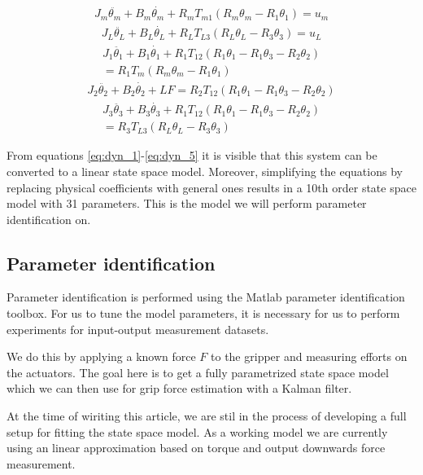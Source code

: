 \documentclass[conference]{IEEEtran}
\begin{document}
\begin{align}\label{eq:dyn_1}
J_m\ddot{{\theta}_m} + B_m \dot{{\theta}_m} + R_m T_{m1}(R_m {\theta}_m - R_1 {\theta}_1) = u_m
\end{align}
\begin{align}\label{eq:dyn_2}
J_L\ddot{{\theta}_L} + B_L \dot{{\theta}_L} + R_L T_{L3}(R_L {\theta}_L - R_3 {\theta}_3) = u_L
\end{align}
\begin{multline}\label{eq:dyn_3}
J_1\ddot{{\theta}_1}+ B_1 \dot{{\theta}_1} + R_1 T_{12}(R_1{\theta_1} - R_1{\theta}_3 - R_2{\theta_2})\\ = R_1 T_m(R_m{\theta}_m - R_1{\theta}_1)
\end{multline}
\begin{align}\label{eq:dyn_4}
J_2\ddot{{\theta}_2}+ B_2 \dot{{\theta}_2} + LF = R_2 T_{12}(R_1{\theta_1} - R_1{\theta}_3 - R_2{\theta_2})
\end{align}
\begin{multline}\label{eq:dyn_5}
J_3\ddot{{\theta}_3}+ B_3 \dot{{\theta}_3} + R_1 T_{12}(R_1{\theta_1} - R_1{\theta}_3 - R_2{\theta_2})\\ = R_3 T_{L3}(R_L{\theta}_L - R_3{\theta}_3)
\end{multline}


From equations \ref{eq:dyn_1}-\ref{eq:dyn_5} it is visible that this system can be converted to a linear state space model.
Moreover, simplifying the equations by replacing physical coefficients with general ones results in a 10th order state space model with 31 parameters.
This is the model we will perform parameter identification on.

\subsection{Parameter identification}
Parameter identification is performed using the Matlab parameter identification toolbox.
For us to tune the model parameters, it is necessary for us to perform experiments for input-output measurement datasets.

We do this by applying a known force $F$ to the gripper and measuring efforts on the actuators.
The goal here is to get a fully parametrized state space model which we can then use for grip force estimation with a Kalman filter.

At the time of wiriting this article, we are stil in the process of developing a full setup for fitting the state space model.
As a working model we are currently using an linear approximation based on torque and output downwards force measurement.
\end{document}

